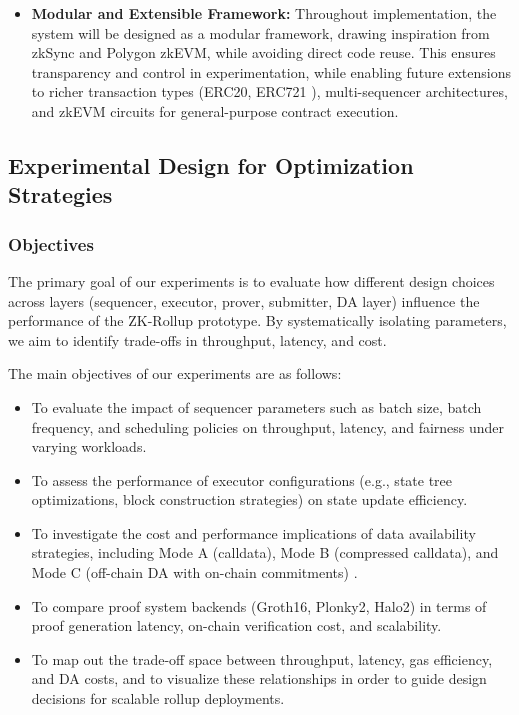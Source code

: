\begin{itemize}
\item \textbf{Modular and Extensible Framework:} Throughout implementation, the system will be designed as a modular framework, drawing inspiration from zkSync and Polygon zkEVM, while avoiding direct code reuse. This ensures transparency and control in experimentation, while enabling future extensions to richer transaction types (ERC20, ERC721 \cite{vogelsteller2015erc20, vogelsteller2018erc721}), multi-sequencer architectures, and zkEVM circuits for general-purpose contract execution.

\end{itemize}



\subsection{Experimental Design for Optimization Strategies}

\subsubsection{Objectives}

The primary goal of our experiments is to evaluate how different design choices across layers (sequencer, executor, prover, submitter, DA layer) influence the performance of the ZK-Rollup prototype. By systematically isolating parameters, we aim to identify trade-offs in throughput, latency, and cost.

The main objectives of our experiments are as follows:

\begin{itemize}

\item To evaluate the impact of sequencer parameters such as batch size, batch frequency, and scheduling policies on throughput, latency, and fairness under varying workloads.

\item To assess the performance of executor configurations (e.g., state tree optimizations, block construction strategies) on state update efficiency.

\item To investigate the cost and performance implications of data availability strategies, including Mode A (calldata), Mode B (compressed calldata), and Mode C (off-chain DA with on-chain commitments) \cite{protocol_ipfs, celestia_how}.

\item To compare proof system backends (Groth16, Plonky2, Halo2) \cite{iden3_circom, sui_groth16, polygon_plonky2, zcash_halo2} in terms of proof generation latency, on-chain verification cost, and scalability.

\item To map out the trade-off space between throughput, latency, gas efficiency, and DA costs, and to visualize these relationships in order to guide design decisions for scalable rollup deployments.

\end{itemize}

